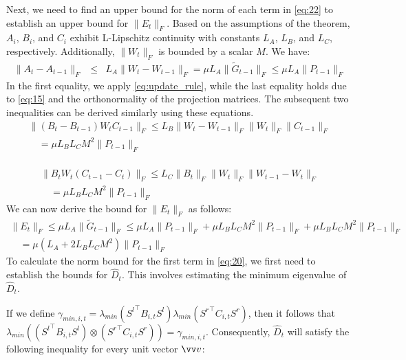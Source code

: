Next, we need to find an upper bound for the norm of each term in \eqref{eq:22} to establish an upper bound for \(\|E_t\|_F\). Based on the assumptions of the theorem, \(A_i\), \(B_i\), and \(C_i\) exhibit L-Lipschitz continuity with constants \(L_A\), \(L_B\), and \(L_C\), respectively. Additionally, \(\|W_t\|_F\) is bounded by a scalar \(M\). We have:
\begin{eqnarray}
    \|A_t - A_{t-1}\|_F &\le& L_A \|W_t - W_{t-1}\|_F = \mu L_A \|\tilde G_{t-1}\|_F \le \mu L_A \|P_{t-1}\|_F 
\end{eqnarray}
In the first equality, we apply \eqref{eq:update_rule}, while the last equality holds due to \eqref{eq:15} and the orthonormality of the projection matrices. The subsequent two inequalities can be derived similarly using these equations.
\begin{equation}
\begin{gathered}
    \|(B_t - B_{t-1})W_t C_{t-1}\|_F \le L_B \|W_t - W_{t-1}\|_F \|W_t\|_F \|C_{t-1}\|_F 
    \\ \quad
    = \mu L_B L_C M^2 \|P_{t-1}\|_F  
\end{gathered}
\end{equation}
\\
\begin{equation}
\begin{gathered}
    \|B_t W_t (C_{t-1} - C_t)\|_F \le L_C  \|B_t\|_F \|W_t\|_F\|W_{t-1} - W_t\|_F 
    \\ \quad
    = \mu L_B L_C M^2 \|P_{t-1}\|_F
\end{gathered}
\end{equation}
We can now derive the bound for \(\|E_t\|_F\) as follows:
\begin{equation}
\begin{gathered}
    \|E_t\|_F \le \mu L_A \|\tilde G_{t-1}\|_F \le \mu L_A \|P_{t-1}\|_F + \mu L_B L_C M^2 \|P_{t-1}\|_F + \mu L_B L_C M^2 \|P_{t-1}\|_F \\ \quad 
    = \mu(L_A + 2L_BL_CM^2)\|P_{t-1}\|_F
\end{gathered}
\end{equation}
To calculate the norm bound for the first term in \eqref{eq:20}, we first need to establish the bounds for \(\widehat{D}_t\). This involves estimating the minimum eigenvalue of \(\widehat{D}_t\). 

If we define \(\gamma_{min, i,t} = \lambda_{min}({S^l}^\top B_{i,t} S^l)\lambda_{min}({S^r}^\top C_{i,t}S^r)\), then it follows that \(\lambda_{min}(({S^l}^\top B_{i,t} S^l)\otimes({S^r}^\top C_{i,t}S^r)) = \gamma_{min, i,t}\). Consequently, \(\widehat{D}_t\) will satisfy the following inequality for every unit vector \(\vv v\):

